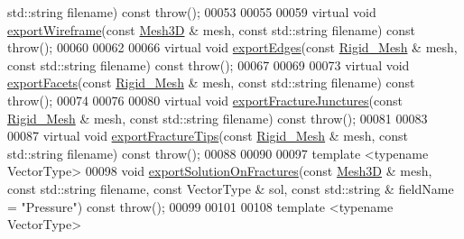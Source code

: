 \begin{DoxyCode}
      std::string filename) \textcolor{keyword}{const} \textcolor{keywordflow}{throw}();
00053 
00055 
00059     \textcolor{keyword}{virtual} \textcolor{keywordtype}{void} \hyperlink{classFVCode3D_1_1ExporterVTU_a672c00cd380554714d09d5d9b0b56a24}{exportWireframe}(\textcolor{keyword}{const} \hyperlink{classFVCode3D_1_1Mesh3D}{Mesh3D} & mesh, \textcolor{keyword}{const} std::string filename) \textcolor{keyword}{
      const} \textcolor{keywordflow}{throw}();
00060 
00062 
00066     \textcolor{keyword}{virtual} \textcolor{keywordtype}{void} \hyperlink{classFVCode3D_1_1ExporterVTU_a3ee8f96689d31f85372b580caffdcc7e}{exportEdges}(\textcolor{keyword}{const} \hyperlink{classFVCode3D_1_1Rigid__Mesh}{Rigid\_Mesh} & mesh, \textcolor{keyword}{const} std::string filename) \textcolor{keyword}{
      const} \textcolor{keywordflow}{throw}();
00067 
00069 
00073     \textcolor{keyword}{virtual} \textcolor{keywordtype}{void} \hyperlink{classFVCode3D_1_1ExporterVTU_a15e1d2e6940ac0a37bf3c4d0ee5dc4d5}{exportFacets}(\textcolor{keyword}{const} \hyperlink{classFVCode3D_1_1Rigid__Mesh}{Rigid\_Mesh} & mesh, \textcolor{keyword}{const} std::string filename) \textcolor{keyword}{
      const} \textcolor{keywordflow}{throw}();
00074 
00076 
00080     \textcolor{keyword}{virtual} \textcolor{keywordtype}{void} \hyperlink{classFVCode3D_1_1ExporterVTU_aef7601095b83f975d009f9cb68563ae4}{exportFractureJunctures}(\textcolor{keyword}{const} \hyperlink{classFVCode3D_1_1Rigid__Mesh}{Rigid\_Mesh} & mesh, \textcolor{keyword}{const} 
      std::string filename) \textcolor{keyword}{const} \textcolor{keywordflow}{throw}();
00081 
00083 
00087     \textcolor{keyword}{virtual} \textcolor{keywordtype}{void} \hyperlink{classFVCode3D_1_1ExporterVTU_a95853064ccbdab9ab24b3aa6f67ff19c}{exportFractureTips}(\textcolor{keyword}{const} \hyperlink{classFVCode3D_1_1Rigid__Mesh}{Rigid\_Mesh} & mesh, \textcolor{keyword}{const} std::string 
      filename) \textcolor{keyword}{const} \textcolor{keywordflow}{throw}();
00088 
00090 
00097     \textcolor{keyword}{template} <\textcolor{keyword}{typename} VectorType>
00098     \textcolor{keywordtype}{void} \hyperlink{classFVCode3D_1_1ExporterVTU_abc88a5113c02b55942862ef39b30ec80}{exportSolutionOnFractures}(\textcolor{keyword}{const} \hyperlink{classFVCode3D_1_1Mesh3D}{Mesh3D} & mesh, \textcolor{keyword}{const} std::string 
      filename, \textcolor{keyword}{const} VectorType & sol, \textcolor{keyword}{const} std::string & fieldName = \textcolor{stringliteral}{"Pressure"}) \textcolor{keyword}{const} \textcolor{keywordflow}{throw}();
00099 
00101 
00108     \textcolor{keyword}{template} <\textcolor{keyword}{typename} VectorType>

\end{DoxyCode}
